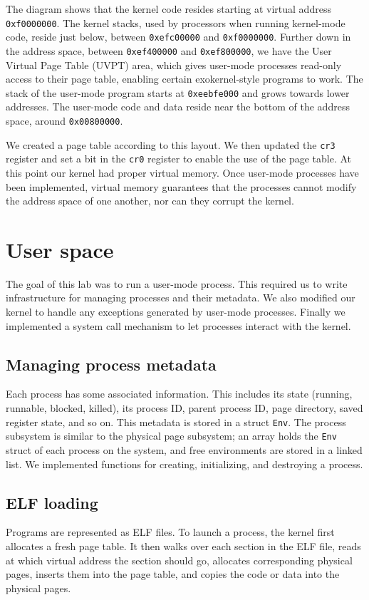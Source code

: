 \documentclass{report}
\begin{document}
The diagram shows that the kernel code resides starting at virtual address
\texttt{0xf0000000}. The kernel stacks, used by processors when running
kernel-mode code, reside just below, between \texttt{0xefc00000} and
\texttt{0xf0000000}. Further down in the address space, between
\texttt{0xef400000} and \texttt{0xef800000}, we have the User Virtual Page
Table (UVPT) area, which gives user-mode processes read-only access to their
page table, enabling certain exokernel-style programs to work. The stack of
the user-mode program starts at \texttt{0xeebfe000} and grows towards lower
addresses. The user-mode code and data reside near the bottom of the address
space, around \texttt{0x00800000}.

We created a page table according to this layout. We then updated the
\texttt{cr3} register and set a bit in the \texttt{cr0} register to enable the
use of the page table. At this point our kernel had proper virtual memory.
Once user-mode processes have been implemented, virtual memory guarantees that
the processes cannot modify the address space of one another, nor can they
corrupt the kernel.


\chapter{User space}

The goal of this lab was to run a user-mode process. This required us to write
infrastructure for managing processes and their metadata. We also modified our
kernel to handle any exceptions generated by user-mode processes. Finally we
implemented a system call mechanism to let processes interact with the kernel.


\section{Managing process metadata}
Each process has some associated information. This includes its state
(running, runnable, blocked, killed), its process ID, parent process ID, page
directory, saved register state, and so on. This metadata is stored in a
struct \texttt{Env}. The process subsystem is similar to the physical page
subsystem; an array holds the \texttt{Env} struct of each process on the
system, and free environments are stored in a linked list. We implemented
functions for creating, initializing, and destroying a process.

\section{ELF loading}
Programs are represented as ELF files. To launch a process, the kernel first
allocates a fresh page table. It then walks over each section in the ELF file,
reads at which virtual address the section should go, allocates corresponding
physical pages, inserts them into the page table, and copies the code or data
into the physical pages.
\end{document}
